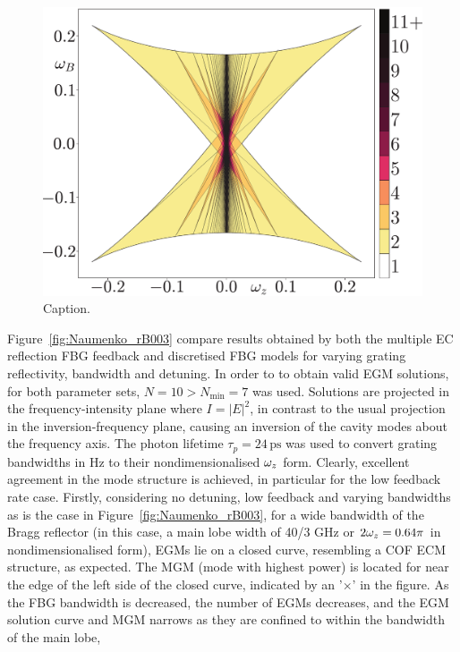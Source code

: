 %
\begin{figure}[!t]
    \centering

    \includegraphics[width=\linewidth]{Images/EGM_components_2D_coloured.pdf}

    \caption{Caption.}
    
    \label{fig:EGM_components}
\end{figure}
%
Figure~\ref{fig:Naumenko_rB003} compare results obtained by both the multiple EC reflection FBG feedback and discretised FBG models for varying grating reflectivity, bandwidth and detuning. 
In order to to obtain valid EGM solutions, for both parameter sets, $N=10 > N_\text{min}=7$ was used. 
Solutions are projected in the frequency-intensity plane where $I = |E|^2$, in contrast to the usual projection in the inversion-frequency plane, causing an inversion of the cavity modes about the frequency axis. 
The photon lifetime $\tau_p=24\,\text{ps}$ was used to convert grating bandwidths in Hz to their nondimensionalised $\omega_z$ form. 
Clearly, excellent agreement in the mode structure is achieved, in particular for the low feedback rate case. 
Firstly, considering no detuning, low feedback and varying bandwidths as is the case in Figure~\ref{fig:Naumenko_rB003}, 
for a wide bandwidth of the Bragg reflector (in this case, a main lobe width of 40/3 GHz or $2\omega_z=0.64\pi$ in nondimensionalised form), EGMs lie on a closed curve, resembling a COF ECM structure, as expected. 
The MGM (mode with highest power) is located for near the edge of the left side of the closed curve, indicated by an '$\times$' in the figure. 
As the FBG bandwidth is decreased, the number of EGMs decreases, and the EGM solution curve and MGM narrows as they are confined to within the bandwidth of the main lobe, 
